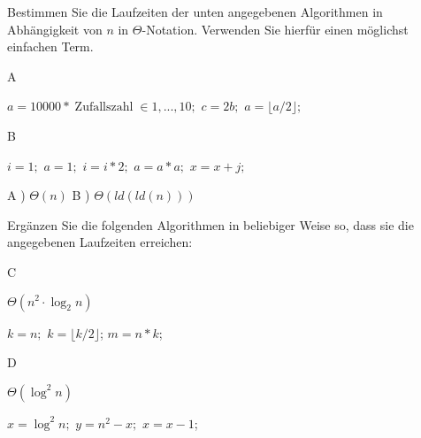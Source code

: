 \documentclass[a4paper, 12pt]{article}
\begin{document}




\begin{angabe}
Bestimmen Sie die Laufzeiten der unten angegebenen Algorithmen in
Abhängigkeit von $n$ in $\Theta$-Notation. Verwenden Sie hierfür einen
möglichst einfachen Term.

A \quad
\begin{minipage}[t]{7cm}
\begin{algorithmic}
\ZEILE $a = 10000 * \operatorname{Zufallszahl} \in {1,...,10};$
    \ZEILE $c = 2b;$
  \ENDFUER
  \ZEILE $a = \lfloor a / 2 \rfloor;$
\ENDSOLANGE
\end{algorithmic}
\end{minipage}
\hfill
B \quad
\begin{minipage}[t]{5cm}
\begin{algorithmic}
\ZEILE $i = 1;$
\ZEILE $a = 1;$ 
\WIEDERHOLE
  \ZEILE $i = i * 2;$
  \ZEILE $a = a * a;$
  \ZEILE $x = x + j;$
\ENDFUER

\end{algorithmic}
\end{minipage}
\end{angabe}

A ) $\Theta(n)$
\newline
B ) $\Theta (ld(ld(n)))$







\begin{angabe}
Ergänzen Sie die folgenden Algorithmen in beliebiger Weise so, dass sie die angegebenen Laufzeiten
erreichen:

C \quad
\begin{minipage}[t]{5cm}
$\Theta(n^2 \cdot \log_{2}{n})$

\begin{algorithmic}
        \ZEILE $k = n;$
        \WIEDERHOLE
                \ZEILE $k = \lfloor k / 2 \rfloor$;
                \ZEILE $m = n * k$;
\ENDFUER
\end{algorithmic}
\end{minipage}
\hfill
D \quad
\begin{minipage}[t]{5cm}
$\Theta(\log^2{n})$

\begin{algorithmic}
\ZEILE $x = \log^2{n};$
  \ZEILE $y = n^2 - x;$
  \ZEILE $x = x - 1$;
\ENDSOLANGE
\end{algorithmic}
\end{minipage}
\hfill\\[1ex]

\end{angabe}
\end{document}
